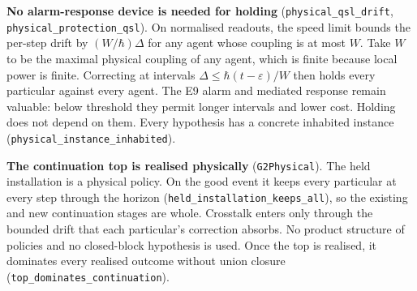 \documentclass[
]{article}
\begin{document}
\textbf{No alarm-response device is needed for holding}
(\texttt{p\allowbreak{}h\allowbreak{}y\allowbreak{}s\allowbreak{}i\allowbreak{}c\allowbreak{}a\allowbreak{}l\allowbreak{}\_\allowbreak{}q\allowbreak{}s\allowbreak{}l\allowbreak{}\_\allowbreak{}d\allowbreak{}r\allowbreak{}i\allowbreak{}f\allowbreak{}t},
\texttt{p\allowbreak{}h\allowbreak{}y\allowbreak{}s\allowbreak{}i\allowbreak{}c\allowbreak{}a\allowbreak{}l\allowbreak{}\_\allowbreak{}p\allowbreak{}r\allowbreak{}o\allowbreak{}t\allowbreak{}e\allowbreak{}c\allowbreak{}t\allowbreak{}i\allowbreak{}o\allowbreak{}n\allowbreak{}\_\allowbreak{}q\allowbreak{}s\allowbreak{}l}).
On normalised readouts, the speed limit bounds the per-step drift by
\((W/\hbar)\Delta\) for any agent whose coupling is at most \(W\). Take
\(W\) to be the maximal physical coupling of any agent, which is finite
because local power is finite. Correcting at intervals
\(\Delta\le\hbar(t-\varepsilon)/W\) then holds every particular against
every agent. The E9 alarm and mediated response remain valuable: below
threshold they permit longer intervals and lower cost. Holding does not
depend on them. Every hypothesis has a concrete inhabited instance
(\texttt{p\allowbreak{}h\allowbreak{}y\allowbreak{}s\allowbreak{}i\allowbreak{}c\allowbreak{}a\allowbreak{}l\allowbreak{}\_\allowbreak{}i\allowbreak{}n\allowbreak{}s\allowbreak{}t\allowbreak{}a\allowbreak{}n\allowbreak{}c\allowbreak{}e\allowbreak{}\_\allowbreak{}i\allowbreak{}n\allowbreak{}h\allowbreak{}a\allowbreak{}b\allowbreak{}i\allowbreak{}t\allowbreak{}e\allowbreak{}d}).

\textbf{The continuation top is realised physically}
(\texttt{G2Physical}). The held installation is a physical policy. On
the good event it keeps every particular at every step through the
horizon
(\texttt{h\allowbreak{}e\allowbreak{}l\allowbreak{}d\allowbreak{}\_\allowbreak{}i\allowbreak{}n\allowbreak{}s\allowbreak{}t\allowbreak{}a\allowbreak{}l\allowbreak{}l\allowbreak{}a\allowbreak{}t\allowbreak{}i\allowbreak{}o\allowbreak{}n\allowbreak{}\_\allowbreak{}k\allowbreak{}e\allowbreak{}e\allowbreak{}p\allowbreak{}s\allowbreak{}\_\allowbreak{}a\allowbreak{}l\allowbreak{}l}),
so the existing and new continuation stages are whole. Crosstalk enters
only through the bounded drift that each particular's correction
absorbs. No product structure of policies and no closed-block hypothesis
is used. Once the top is realised, it dominates every realised outcome
without union closure
(\texttt{t\allowbreak{}o\allowbreak{}p\allowbreak{}\_\allowbreak{}d\allowbreak{}o\allowbreak{}m\allowbreak{}i\allowbreak{}n\allowbreak{}a\allowbreak{}t\allowbreak{}e\allowbreak{}s\allowbreak{}\_\allowbreak{}c\allowbreak{}o\allowbreak{}n\allowbreak{}t\allowbreak{}i\allowbreak{}n\allowbreak{}u\allowbreak{}a\allowbreak{}t\allowbreak{}i\allowbreak{}o\allowbreak{}n}).
\end{document}

